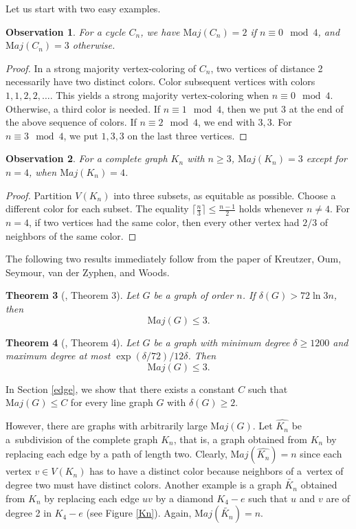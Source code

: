 \documentclass[11pt]{article}
\newtheorem{theorem}{Theorem}
\newtheorem{observation}[theorem]{Observation}
\begin{document}
Let us start with two easy examples.
\begin{observation}\label{cycle}
For a cycle $C_n$, we have ${\mathrm Maj}(C_n)=2$ if $n\equiv 0 \mod{4}$, and ${\mathrm Maj}(C_n)=3$ otherwise.  
\end{observation}
\begin{proof}
In a strong majority vertex-coloring of $C_n$, two vertices of distance 2 necessarily have two distinct colors. Color subsequent vertices with colors $1,1,2,2,\ldots$. This yields a strong majority vertex-coloring when $n\equiv 0 \mod{4}$. Otherwise, a third color is needed.   If $n\equiv 1 \mod{4}$, then we put 3 at the end of the above sequence of  colors. If $n\equiv 2\mod 4$, we end with $3,3$. For $n\equiv 3\mod 4$, we put $1,3,3$ on the last three vertices.
\end{proof}
\begin{observation}
For a complete graph $K_n$ with $n\ge 3$, ${\mathrm Maj}(K_n)=3$ except for $n=4$, when ${\mathrm Maj}(K_n)=4$.   
\end{observation}
\begin{proof}
Partition $V(K_n)$ into three subsets, as equitable as possible. Choose a different color for each subset. The equality $\lceil\frac n3\rceil\le \frac{n-1}{2}$ holds whenever $n\ne 4$. For $n=4$, if two vertices had the same color, then every other vertex had $2/3$ of neighbors of the same color.  
\end{proof}

The following two results immediately follow from the paper \cite{KOSvW17} of Kreutzer, Oum, Seymour, van der Zyphen, and Woods.  

\begin{theorem}[\cite{KOSvW17}, Theorem 3]
Let $G$ be a graph of order $n$. If $\delta(G)> 72\ln 3n$,
then $${\mathrm Maj}(G)\le 3.$$
\end{theorem}
\begin{theorem} [\cite{KOSvW17}, Theorem 4]
Let $G$ be a graph with minimum degree $\delta\ge 1200$ and maximum degree at most $\exp{(\delta/72)}/12\delta$. Then $${\mathrm Maj}(G)\le 3.$$
\end{theorem} 

In Section \ref{edge}, we show that there exists a constant $C$ such that ${\mathrm Maj}(G)\le C$ for every line graph $G$ with $\delta(G)\ge 2$.

\vspace{0.5cm}

However, there are graphs with arbitrarily large ${\mathrm Maj}(G)$. Let $\widehat{K_n}$ be a~subdivision of the complete graph $K_n$, that is, a graph obtained from $K_n$ by replacing each edge by a path of length two. Clearly, ${\mathrm Maj}(\widehat{K_n})=n$ since each vertex $v\in V(K_n)$ has to have a distinct color because neighbors of a~vertex of degree two must have distinct colors. 
 Another example is a graph $\widetilde{K_n}$ obtained from $K_n$ by replacing each edge $uv$ by a diamond $K_4-e$ such that $u$ and $v$ are of degree 2 in $K_4-e$ (see Figure \ref{Kn}). Again, ${\mathrm Maj}(\widetilde{K_n})=n$. 
\end{document}
